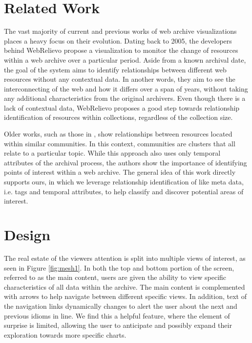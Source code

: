 \documentclass[10pt,journal,compsoc]{IEEEtran}
\begin{document}
\section{Related Work}
The vast majority of current and previous works of web archive visualizations places a heavy focus on their evolution. Dating back to 2005, the developers behind WebRelievo \cite{toyoda2005system} propose a visualization to monitor the change of resources within a web archive over a particular period. Aside from a known archival date, the goal of the system aims to identify relationships between different web resources without any contextual data. In another words, they aim to see the interconnecting of the web and how it differs over a span of years, without taking any additional characteristics from the original archivers. Even though there is a lack of contextual data, WebRelievo proposes a good step towards relationship identification of resources within collections, regardless of the collection size. \par

Older works, such as those in \cite{toyoda2003extracting}, show relationships between resources located within similar communities. In this context, communities are clusters that all relate to a particular topic. While this approach also uses only temporal attributes of the archival process, the authors show the importance of identifying points of interest within a web archive. The general idea of this work directly supports ours, in which we leverage relationship identification of like meta data, i.e. tags and temporal attributes, to help classify and discover potential areas of interest. \par


\section{Design}
The real estate of the viewers attention is split into multiple views of interest, as seen in Figure \ref{fig:mesh1}. In both the top and bottom portion of the screen, referred to as the main content, users are given the ability to view specific characteristics of all data within the archive. The main content is complemented with arrows to help navigate between different specific views. In addition, text of the navigation links dynamically changes to alert the user about the next and previous idioms in line. We find this a helpful feature, where the element of surprise is limited, allowing the user to anticipate and possibly expand their exploration towards more specific charts.  \par
\end{document}
